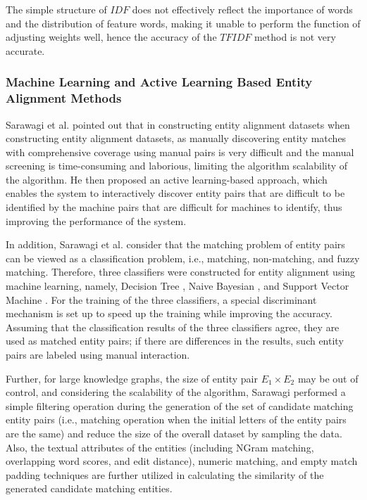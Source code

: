 \documentclass[sigconf]{acmart}
\begin{document}
{The simple structure of $IDF$ does not effectively reflect the importance of words and the distribution of feature words, making it unable to perform the function of adjusting weights well, hence the accuracy of the $TFIDF$ method is not very accurate.


\subsubsection{Machine Learning and Active Learning Based Entity Alignment Methods }

Sarawagi et al. \cite{sarawagi2002interactive}pointed out that in constructing entity alignment datasets when constructing entity alignment datasets, as manually discovering entity matches with comprehensive coverage using manual pairs is very difficult and the manual screening is time-consuming and laborious, limiting the algorithm scalability of the algorithm. He then proposed an active learning-based approach, which enables the system to interactively discover entity pairs that are difficult to be identified by the machine pairs that are difficult for machines to identify, thus improving the performance of the system.

In addition, Sarawagi et al. consider that the matching problem of entity pairs can be viewed as a classification problem, i.e., matching, non-matching, and fuzzy matching. Therefore, three classifiers were constructed for entity alignment using machine learning, namely, Decision Tree \cite{safavian1991survey}, Naive Bayesian \cite{wang2007naive}, and Support Vector Machine \cite{chang2001library}.
For the training of the three classifiers, a special discriminant mechanism is set up to speed up the training while improving the accuracy. Assuming that the classification results of the three classifiers agree, they are used as matched entity pairs; if there are differences in the results, such entity pairs are labeled using manual interaction.

Further, for large knowledge graphs, the size of entity pair $E_1 \times E_2$ may be out of control, and considering the scalability of the algorithm, Sarawagi \cite{sarawagi2002interactive} performed a simple filtering operation during the generation of the set of candidate matching entity pairs (i.e., matching operation when the initial letters of the entity pairs are the same) and reduce the size of the overall dataset by sampling the data. Also, the textual attributes of the entities (including NGram matching, overlapping word scores, and edit distance), numeric matching, and empty match padding techniques are further utilized in calculating the similarity of the generated candidate matching entities.

}
\end{document}
